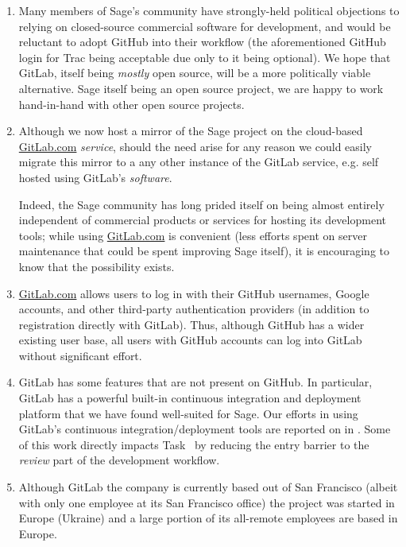 \begin{enumerate}
\item Many members of Sage's community have strongly-held political objections
    to relying on closed-source commercial software for development, and would
    be reluctant to adopt GitHub into their workflow (the aforementioned GitHub
    login for Trac being acceptable due only to it being optional).  We hope
    that GitLab, itself being {\em mostly} open source, will be a more
    politically viable alternative. Sage itself being an open source project,
    we are happy to work hand-in-hand with other open source projects.

  \item Although we now host a mirror of the Sage project on
    the cloud-based \url{GitLab.com} {\em service}, should the need
    arise for any reason we could easily migrate this mirror to a
    any other instance of the GitLab service, e.g. self hosted using
    GitLab's {\em software}.

    Indeed, the Sage community has long prided itself on being almost entirely
    independent of commercial products or services for hosting its
    development tools; while using \url{GitLab.com} is convenient (less
    efforts spent on server maintenance that could be spent improving Sage
    itself), it is encouraging to know that the possibility exists.

\item \url{GitLab.com} allows users to log in with their GitHub usernames, Google
    accounts, and other third-party authentication providers (in addition to
    registration directly with GitLab).  Thus, although GitHub has a wider
    existing user base, all users with GitHub accounts can log into GitLab
    without significant effort.

\item GitLab has some features that are not present on GitHub.  In particular,
    GitLab has a powerful built-in continuous integration and deployment
    platform that we have found well-suited for Sage.  Our efforts in using
    GitLab's continuous integration/deployment tools are reported on in
    .  Some of
    this work directly impacts
    Task~ by reducing the entry
    barrier to the {\em review} part of the development workflow.

\item Although GitLab the company is currently based out of San Francisco
    (albeit with only one employee at its San Francisco office) the project
    was started in Europe (Ukraine) and a large portion of its all-remote
    employees are based in Europe.
\end{enumerate}

